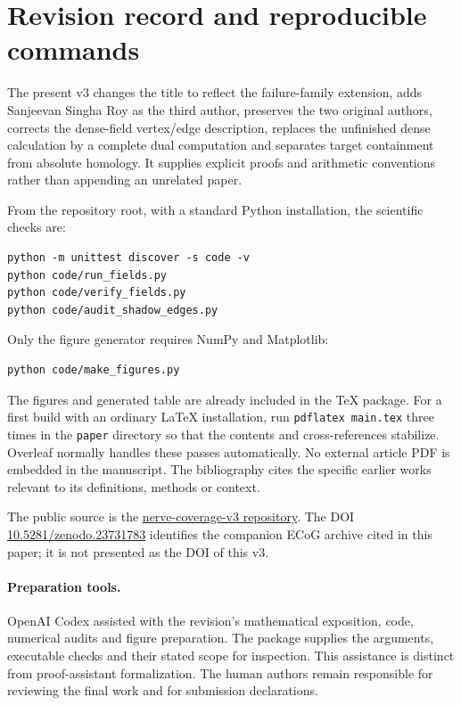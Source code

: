\section{Revision record and reproducible commands}
The present v3 changes the title to reflect the failure-family extension, adds Sanjeevan Singha Roy as the third author, preserves the two original authors, corrects the dense-field vertex/edge description, replaces the unfinished dense calculation by a complete dual computation and separates target containment from absolute homology. It supplies explicit proofs and arithmetic conventions rather than appending an unrelated paper.

From the repository root, with a standard Python installation, the scientific checks are:
\begin{verbatim}
python -m unittest discover -s code -v
python code/run_fields.py
python code/verify_fields.py
python code/audit_shadow_edges.py
\end{verbatim}
Only the figure generator requires NumPy and Matplotlib:
\begin{verbatim}
python code/make_figures.py
\end{verbatim}
The figures and generated table are already included in the TeX package. For a first build with an ordinary LaTeX installation, run \texttt{pdflatex main.tex} three times in the \texttt{paper} directory so that the contents and cross-references stabilize. Overleaf normally handles these passes automatically. No external article PDF is embedded in the manuscript. The bibliography cites the specific earlier works relevant to its definitions, methods or context.

The public source is the \href{https://github.com/creelie/nerve-coverage-v3}{nerve-coverage-v3 repository}. The DOI \href{https://doi.org/10.5281/zenodo.23731783}{10.5281/zenodo.23731783} identifies the companion ECoG archive cited in this paper; it is not presented as the DOI of this v3.

\paragraph{Preparation tools.}
OpenAI Codex assisted with the revision's mathematical exposition, code, numerical audits and figure preparation. The package supplies the arguments, executable checks and their stated scope for inspection. This assistance is distinct from proof-assistant formalization. The human authors remain responsible for reviewing the final work and for submission declarations.
